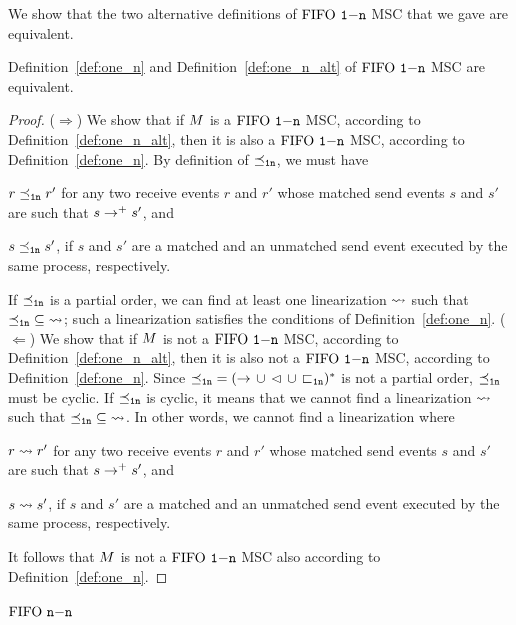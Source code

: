 We show  that the two alternative definitions of $\text{FIFO } \mathtt{1\mathsf{-}n}$ MSC that we gave are equivalent.

\begin{proposition}
    Definition~\ref{def:one_n} and Definition~\ref{def:one_n_alt} of $\text{FIFO } \mathtt{1\mathsf{-}n}$ MSC are equivalent.
\end{proposition}
\begin{proof}
    ($\Rightarrow$)  We show that if $M$ is a $\text{FIFO } \mathtt{1\mathsf{-}n}$ MSC, according to Definition~\ref{def:one_n_alt}, then it is also a $\text{FIFO } \mathtt{1\mathsf{-}n}$ MSC, according to Definition~\ref{def:one_n}. By definition of $\preceq_{\mathtt{1n}}$, we must have 
    \begin{enumerate*}[label={(\roman*)}]
        \item $r \preceq_{\mathtt{1n}} r'$ for any two receive events $r$ and $r'$ whose matched send events $s$ and $s'$ are such that $s \to^+ s'$, and
        \item $s \preceq_{\mathtt{1n}} s'$, if $s$ and $s'$ are a matched and an unmatched send event executed by the same process, respectively.
    \end{enumerate*} 
    If $\preceq_{\mathtt{1n}}$ is a partial order, we can find at least one linearization $\rightsquigarrow$ such that $\preceq_{\mathtt{1n}} \;\subseteq\; \rightsquigarrow$; such a linearization satisfies the conditions of Definition~\ref{def:one_n}.\newline
    ($\Leftarrow$) We show that if $M$ is not a $\text{FIFO } \mathtt{1\mathsf{-}n}$ MSC, according to Definition~\ref{def:one_n_alt}, then it is also not a $\text{FIFO } \mathtt{1\mathsf{-}n}$ MSC, according to Definition~\ref{def:one_n}. Since ${\preceq_{\mathtt{1n}}} = ({\to} \,\cup\, {\lhd} \,\cup\, {\sqsubset_{\mathtt{1n}}})^\ast$ is not a partial order, $\preceq_{\mathtt{1n}}$ must be cyclic. If $\preceq_{\mathtt{1n}}$ is cyclic, it means that we cannot find a linearization $\rightsquigarrow$ such that $\preceq_{\mathtt{1n}} \;\subseteq\; \rightsquigarrow$. In other words, we cannot find a linearization where      
    \begin{enumerate*}[label={(\roman*)}]
        \item $r \rightsquigarrow r'$ for any two receive events $r$ and $r'$ whose matched send events $s$ and $s'$ are such that $s \to^+ s'$, and
        \item $s \rightsquigarrow s'$, if $s$ and $s'$ are a matched and an unmatched send event executed by the same process, respectively.
    \end{enumerate*} 
    It follows that $M$ is not a $\text{FIFO } \mathtt{1\mathsf{-}n}$ MSC also according to Definition~\ref{def:one_n}.
\end{proof}

\paragraph*{\bf $\text{FIFO } \mathtt{n\mathsf{-}n}$}

